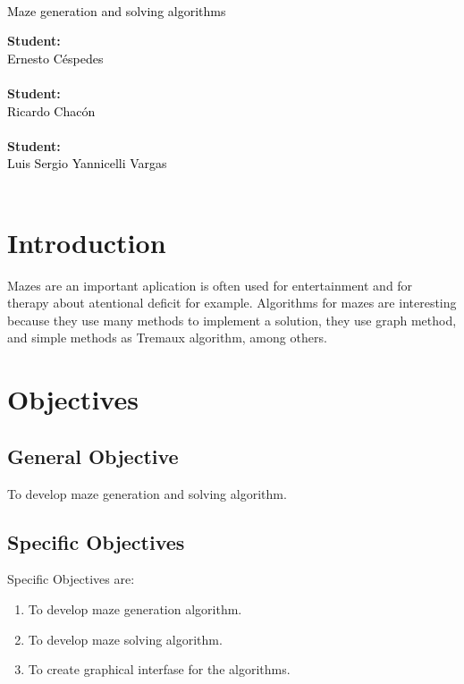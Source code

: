\documentclass[letterpaper]{article}
\newcommand{\uic}{black} %
\newcommand{\uim}{\\} %
\newcommand{\userinput}[1]{\textcolor{\uic}{\uim#1\uim}}
\begin{document}
\vspace*{2cm}

\begin{center}
\Huge
\userinput{Maze generation and solving algorithms}
\vspace*{1cm}
\end{center}

\noindent
\small\baselineskip=14pt
\textbf{Student:} \userinput{Ernesto C\'espedes}\\
\textbf{Student:} \userinput{Ricardo Chac\'on}\\
\textbf{Student:} \userinput{Luis Sergio Yannicelli Vargas}\\

\section{Introduction}

Mazes are an important aplication is often used for entertainment and for therapy about atentional deficit for example. Algorithms for mazes are interesting because they use many methods to implement a solution, they use graph method, and simple methods as Tremaux algorithm, among others.

\section{Objectives}

\subsection{General Objective}

To develop maze generation and solving algorithm.

\subsection{Specific Objectives}

Specific Objectives are:\\

\begin{enumerate}
\item To develop maze generation algorithm.
\item To develop maze solving algorithm.
\item To create graphical interfase for the algorithms.
\end{enumerate}
\end{document}
